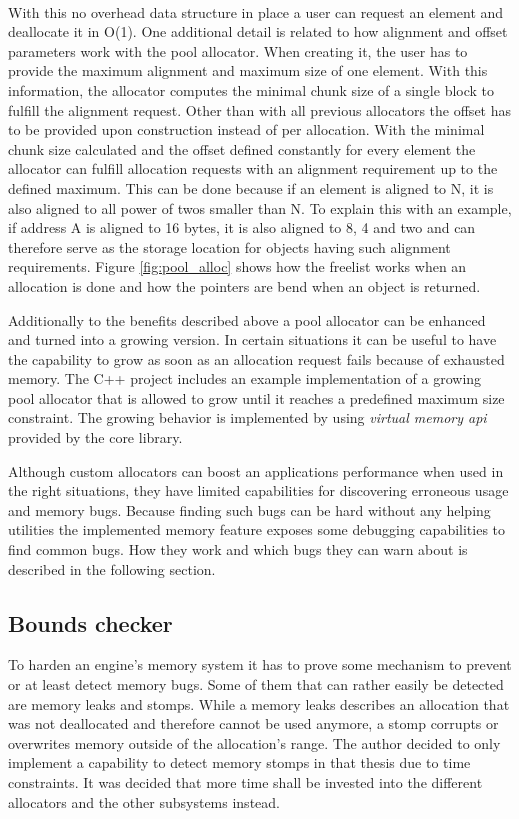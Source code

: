 \noindent
\\
With this no overhead data structure in place a user can request an element and deallocate it in O(1). One additional detail is related to how alignment and offset parameters work with the pool allocator. When creating it, the user has to provide the maximum alignment and maximum size of one element. With this information, the allocator computes the minimal chunk size of a single block to fulfill the alignment request. Other than with all previous allocators the offset has to be provided upon construction instead of per allocation. With the minimal chunk size calculated and the offset defined constantly for every element the allocator can fulfill allocation requests with an alignment requirement up to the defined maximum. This can be done because if an element is aligned to N, it is also aligned to all power of twos smaller than N. To explain this with an example, if address A is aligned to 16 bytes, it is also aligned to 8, 4 and two and can therefore serve as the storage location for objects having such alignment requirements. Figure \ref{fig:pool_alloc} shows how the freelist works when an allocation is done and how the pointers are bend when an object is returned.

Additionally to the benefits described above a pool allocator can be enhanced and turned into a growing version. In certain situations it can be useful to have the capability to grow as soon as an allocation request fails because of exhausted memory. The C++ project includes an example implementation of a growing pool allocator that is allowed to grow until it reaches a predefined maximum size constraint. The growing behavior is implemented by using \textit{virtual memory api} provided by the core library.

Although custom allocators can boost an applications performance when used in the right situations, they have limited capabilities for discovering erroneous usage and memory bugs. Because finding such bugs can be hard without any helping utilities the implemented memory feature exposes some debugging capabilities to find common bugs. How they work and which bugs they can warn about is described in the following section.

\subsection{Bounds checker}

To harden an engine's memory system it has to prove some mechanism to prevent or at least detect memory bugs. Some of them that can rather easily be detected are memory leaks and stomps. While a memory leaks describes an allocation that was not deallocated and therefore cannot be used anymore, a stomp corrupts or overwrites memory outside of the allocation's range. The author decided to only implement a capability to detect memory stomps in that thesis due to time constraints. It was decided that more time shall be invested into the different allocators and the other subsystems instead.

